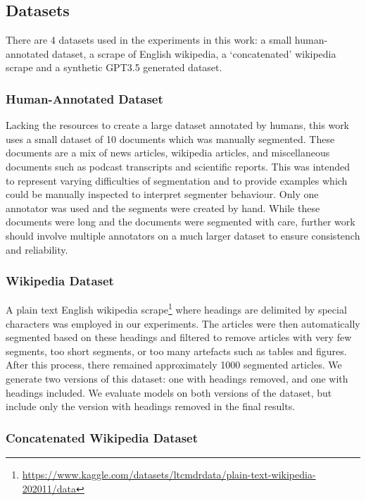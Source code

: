 \subsection{Datasets}

There are 4 datasets used in the experiments in this work: a small human-annotated dataset, a scrape of English wikipedia, a `concatenated' wikipedia scrape and a synthetic GPT3.5 generated dataset.

\subsubsection{Human-Annotated Dataset}

Lacking the resources to create a large dataset annotated by humans, this work uses a small dataset of 10 documents which was manually segmented. These documents are a mix of news articles, wikipedia articles, and miscellaneous documents such as podcast transcripts and scientific reports. This was intended to represent varying difficulties of segmentation and to provide examples which could be manually inspected to interpret segmenter behaviour. Only one annotator was used and the segments were created by hand. While these documents were long and the documents were segmented with care, further work should involve multiple annotators on a much larger dataset to ensure consistench and reliability.

\subsubsection{Wikipedia Dataset}

A plain text English wikipedia scrape\footnote{\url{https://www.kaggle.com/datasets/ltcmdrdata/plain-text-wikipedia-202011/data}} where headings are delimited by special characters was employed in our experiments. The articles were then automatically segmented based on these headings and filtered to remove articles with very few segments, too short segments, or too many artefacts such as tables and figures. After this process, there remained approximately 1000 segmented articles. We generate two versions of this dataset: one with headings removed, and one with headings included. We evaluate models on both versions of the dataset, but include only the version with headings removed in the final results.

\subsubsection{Concatenated Wikipedia Dataset}

